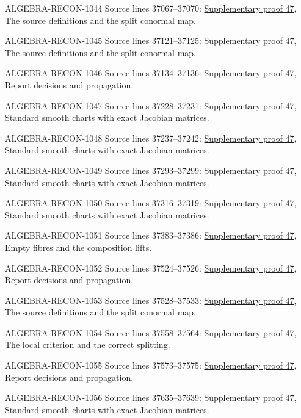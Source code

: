 \begin{AlgebraSourceRoutes}
\item[ALGEBRA-RECON-1044] Source lines 37067--37070: \hyperlink{algebra_smooth_notes_20260928}{Supplementary proof 47}, The source definitions and the split conormal map.
\item[ALGEBRA-RECON-1045] Source lines 37121--37125: \hyperlink{algebra_smooth_notes_20260928}{Supplementary proof 47}, The source definitions and the split conormal map.
\item[ALGEBRA-RECON-1046] Source lines 37134--37136: \hyperlink{algebra_smooth_notes_20260928}{Supplementary proof 47}, Report decisions and propagation.
\item[ALGEBRA-RECON-1047] Source lines 37228--37231: \hyperlink{algebra_smooth_notes_20260928}{Supplementary proof 47}, Standard smooth charts with exact Jacobian matrices.
\item[ALGEBRA-RECON-1048] Source lines 37237--37242: \hyperlink{algebra_smooth_notes_20260928}{Supplementary proof 47}, Standard smooth charts with exact Jacobian matrices.
\item[ALGEBRA-RECON-1049] Source lines 37293--37299: \hyperlink{algebra_smooth_notes_20260928}{Supplementary proof 47}, Standard smooth charts with exact Jacobian matrices.
\item[ALGEBRA-RECON-1050] Source lines 37316--37319: \hyperlink{algebra_smooth_notes_20260928}{Supplementary proof 47}, Standard smooth charts with exact Jacobian matrices.
\item[ALGEBRA-RECON-1051] Source lines 37383--37386: \hyperlink{algebra_smooth_notes_20260928}{Supplementary proof 47}, Empty fibres and the composition lifts.
\item[ALGEBRA-RECON-1052] Source lines 37524--37526: \hyperlink{algebra_smooth_notes_20260928}{Supplementary proof 47}, Report decisions and propagation.
\item[ALGEBRA-RECON-1053] Source lines 37528--37533: \hyperlink{algebra_smooth_notes_20260928}{Supplementary proof 47}, The source definitions and the split conormal map.
\item[ALGEBRA-RECON-1054] Source lines 37558--37564: \hyperlink{algebra_smooth_notes_20260928}{Supplementary proof 47}, The local criterion and the correct splitting.
\item[ALGEBRA-RECON-1055] Source lines 37573--37575: \hyperlink{algebra_smooth_notes_20260928}{Supplementary proof 47}, Report decisions and propagation.
\item[ALGEBRA-RECON-1056] Source lines 37635--37639: \hyperlink{algebra_smooth_notes_20260928}{Supplementary proof 47}, Standard smooth charts with exact Jacobian matrices.

\end{AlgebraSourceRoutes}

